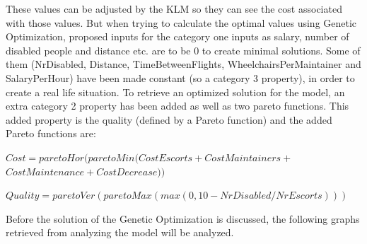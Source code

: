 \documentclass[a4paper, 11pt, notitlepage]{report}
\begin{document}
\vspace{-4pt}These values can be adjusted by the KLM so they can see the cost associated with those values. But when trying to calculate the optimal values using Genetic Optimization, proposed inputs for the category one inputs as salary, number of disabled people and distance etc. are to be 0 to create minimal solutions. Some of them (NrDisabled, Distance, TimeBetweenFlights, WheelchairsPerMaintainer and SalaryPerHour) have been made constant (so a category 3 property), in order to create a real life situation. To retrieve an optimized solution for the model, an extra category 2 property has been added as well as two pareto functions. This added property is the quality (defined by a Pareto function) and the added Pareto functions are:

\begin{center}
\vspace{-4pt}$Cost=paretoHor(paretoMin(CostEscorts+CostMaintainers+$\\$CostMaintenance+CostDecrease))$
\end{center}
\begin{center}
\vspace{-8pt}$Quality=paretoVer(paretoMax(max(0,10-NrDisabled/NrEscorts)))$
\end{center}
\vspace{-4pt}Before the solution of the Genetic Optimization is discussed, the following graphs retrieved from analyzing the model will be analyzed.
\end{document}
